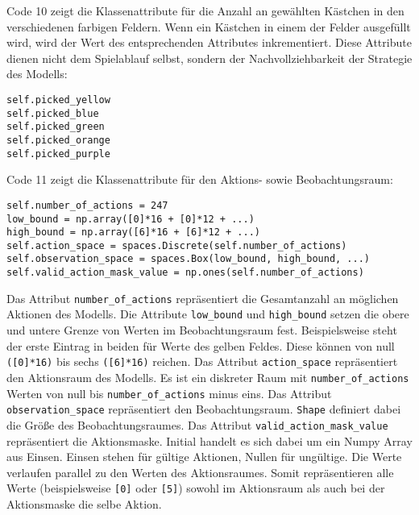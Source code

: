 \begin{minipage}{\linewidth}
Code 10 zeigt die Klassenattribute für die Anzahl an gewählten Kästchen in den verschiedenen farbigen Feldern. Wenn ein Kästchen in einem der Felder ausgefüllt wird, wird der Wert des entsprechenden Attributes inkrementiert. Diese Attribute dienen nicht dem Spielablauf selbst, sondern der Nachvollziehbarkeit der Strategie des Modells:
\vspace{0.5cm}
\begin{lstlisting}[caption={Klassenattribute für die Anzahl an gewählte Kästchen innerhalb der farbigen Feldern}, basicstyle=\ttfamily]
self.picked_yellow
self.picked_blue
self.picked_green
self.picked_orange
self.picked_purple
\end{lstlisting}
\end{minipage}

\begin{minipage}{\linewidth}
Code 11 zeigt die Klassenattribute für den Aktions- sowie Beobachtungsraum:
\vspace{0.5cm}
\begin{lstlisting}[caption={Klassenattribute des Aktions- und Beobachtungsraumes}, basicstyle=\ttfamily]
self.number_of_actions = 247
low_bound = np.array([0]*16 + [0]*12 + ...)
high_bound = np.array([6]*16 + [6]*12 + ...)
self.action_space = spaces.Discrete(self.number_of_actions)
self.observation_space = spaces.Box(low_bound, high_bound, ...)
self.valid_action_mask_value = np.ones(self.number_of_actions)
\end{lstlisting}
\end{minipage}

Das Attribut \texttt{number\_of\_actions} repräsentiert die Gesamtanzahl an möglichen Aktionen des Modells. Die Attribute \texttt{low\_bound} und \texttt{high\_bound} setzen die obere und untere Grenze von Werten im Beobachtungsraum fest. Beispielsweise steht der erste Eintrag in beiden für Werte des gelben Feldes. Diese können von null \texttt{([0]*16)} bis sechs \texttt{([6]*16)} reichen. Das Attribut \texttt{action\_space} repräsentiert den Aktionsraum des Modells. Es ist ein diskreter Raum mit \texttt{number\_of\_actions} Werten von null bis \texttt{number\_of\_actions} minus eins. Das Attribut \texttt{observation\_space} repräsentiert den Beobachtungsraum. \texttt{Shape} definiert dabei die Größe des Beobachtungsraumes. Das Attribut \texttt{valid\_action\_mask\_value} repräsentiert die Aktionsmaske. Initial handelt es sich dabei um ein Numpy Array aus Einsen. Einsen stehen für gültige Aktionen, Nullen für ungültige. Die Werte verlaufen parallel zu den Werten des Aktionsraumes. Somit repräsentieren alle Werte (beispielsweise \texttt{[0]} oder \texttt{[5]}) sowohl im Aktionsraum als auch bei der Aktionsmaske die selbe Aktion.\\

